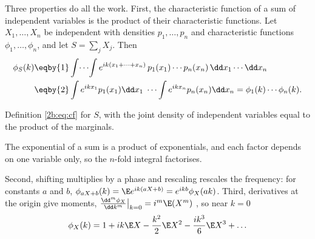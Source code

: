 Three properties do all the work. First, the characteristic function of a sum of independent variables is the product of their characteristic functions. Let $X_1,\dots,X_n$ be independent with densities $p_1,\dots,p_n$ and characteristic functions $\phi_1,\dots,\phi_n$, and let $S=\sum_jX_j$. Then
\begin{align}
  \phi_S(k)
  &\eqby{1} \int\!\cdots\!\int e^{ik(x_1+\dots+x_n)}\,p_1(x_1)\cdots p_n(x_n)\,\dd x_1\cdots\dd x_n \nonumber\\
  &\eqby{2} \int e^{ikx_1}p_1(x_1)\dd x_1\;\cdots\int e^{ikx_n}p_n(x_n)\dd x_n
  = \phi_1(k)\cdots\phi_n(k) .
  \label{2b:eq:cf-sum}
\end{align}
\begin{explain}
  \item Definition \eqref{2b:eq:cf} for $S$, with the joint density of independent variables equal to the product of the marginals.
  \item The exponential of a sum is a product of exponentials, and each factor depends on one variable only, so the $n$-fold integral factorises.
\end{explain}
Second, shifting multiplies by a phase and rescaling rescales the frequency: for constants $a$ and $b$, $\phi_{aX+b}(k)=\E e^{ik(aX+b)}=e^{ikb}\phi_X(ak)$. Third, derivatives at the origin give moments, $\frac{\dd^m\phi_X}{\dd k^m}\big|_{k=0}=i^m\E(X^m)$ , so near $k=0$
\begin{equation}
  \phi_X(k)=1+ik\E X-\frac{k^2}{2}\E X^2-\frac{ik^3}{6}\E X^3+\dots
  \label{2b:eq:cf-taylor}
\end{equation}

